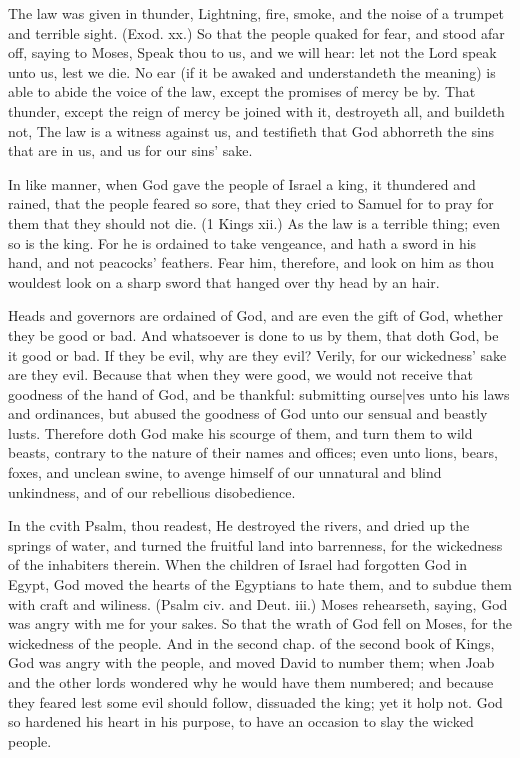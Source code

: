 The law was given in thunder, Lightning, fire, smoke, 
and the noise of a trumpet and terrible sight. (Exod. xx.)
So that the people quaked for fear, and stood afar off,
saying to Moses, Speak thou to us, and we will hear:
let not the Lord speak unto us, lest we die. No ear (if 
it be awaked and understandeth the meaning) is able to 
abide the voice of the law, except the promises of mercy 
be by. That thunder, except the reign of mercy be joined 
with it, destroyeth all, and buildeth not, The law is a 
witness against us, and testifieth that God abhorreth the 
sins that are in us, and us for our sins' sake.

In like manner, when God gave the people of Israel 
a king, it thundered and rained, that the people feared 
so sore, that they cried to Samuel for to pray for them 
that they should not die. (1 Kings xii.) As the law is a 
terrible thing; even so is the king. For he is ordained 
to take vengeance, and hath a sword in his hand, and not 
peacocks' feathers. Fear him, therefore, and look on
him as thou wouldest look on a sharp sword that hanged 
over thy head by an hair.

Heads and governors are ordained of God, and are 
even the gift of God, whether they be good or bad. And 
whatsoever is done to us by them, that doth God, be it 
good or bad. If they be evil, why are they evil? Verily, 
for our wickedness' sake are they evil. Because that when 
they were good, we would not receive that goodness of the 
hand of God, and be thankful: submitting ourse|ves unto 
his laws and ordinances, but abused the goodness of God 
unto our sensual and beastly lusts. Therefore doth God 
make his scourge of them, and turn them to wild beasts, 
contrary to the nature of their names and offices; even
unto lions, bears, foxes, and unclean swine, to avenge
himself of our unnatural and blind unkindness, and of 
our rebellious disobedience. 

In the cvith Psalm, thou readest, He destroyed the 
rivers, and dried up the springs of water, and turned the 
fruitful land into barrenness, for the wickedness of the inhabiters
therein. When the children of Israel had forgotten
God in Egypt, God moved the hearts of the 
Egyptians to hate them, and to subdue them with craft 
and wiliness. (Psalm civ. and Deut. iii.) Moses rehearseth,
saying, God was angry with me for your 
sakes. So that the wrath of God fell on Moses, for the 
wickedness of the people. And in the second chap. of 
the second book of Kings, God was angry with the people, 
and moved David to number them; when Joab and the 
other lords wondered why he would have them numbered;
and because they feared lest some evil should follow, dissuaded
the king; yet it holp not. God so hardened his 
heart in his purpose, to have an occasion to slay the wicked 
people. 


